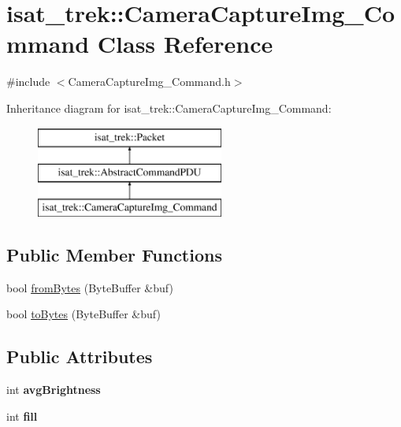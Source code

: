 \hypertarget{classisat__trek_1_1_camera_capture_img___command}{}\section{isat\+\_\+trek\+:\+:Camera\+Capture\+Img\+\_\+\+Command Class Reference}
\label{classisat__trek_1_1_camera_capture_img___command}


{\ttfamily \#include $<$Camera\+Capture\+Img\+\_\+\+Command.\+h$>$}

Inheritance diagram for isat\+\_\+trek\+:\+:Camera\+Capture\+Img\+\_\+\+Command\+:\begin{figure}[H]
\begin{center}
\leavevmode
\includegraphics[height=3.000000cm]{classisat__trek_1_1_camera_capture_img___command}
\end{center}
\end{figure}
\subsection*{Public Member Functions}
\begin{DoxyCompactItemize}
\item 
bool \hyperlink{classisat__trek_1_1_camera_capture_img___command_ae766c5c98f697abf11370b8388f9c7d9}{from\+Bytes} (Byte\+Buffer \&buf)
\item 
bool \hyperlink{classisat__trek_1_1_camera_capture_img___command_ab7333d2572b3d73089b4e147f6104bcd}{to\+Bytes} (Byte\+Buffer \&buf)
\end{DoxyCompactItemize}
\subsection*{Public Attributes}
\begin{DoxyCompactItemize}
\item 
int {\bfseries avg\+Brightness}\hypertarget{classisat__trek_1_1_camera_capture_img___command_acc0042572a8c9772f080e5dd423869f3}{}\label{classisat__trek_1_1_camera_capture_img___command_acc0042572a8c9772f080e5dd423869f3}

\item 
int {\bfseries fill}\hypertarget{classisat__trek_1_1_camera_capture_img___command_a84bae9d631608a471a8b2a8c197ddf4d}{}\label{classisat__trek_1_1_camera_capture_img___command_a84bae9d631608a471a8b2a8c197ddf4d}

\end{DoxyCompactItemize}


